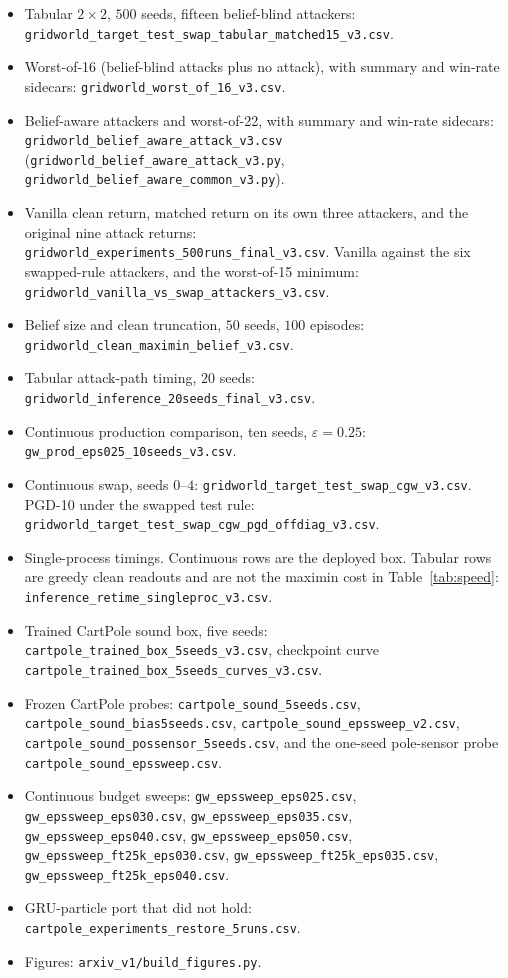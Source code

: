 \documentclass[10pt,twocolumn]{article}
\begin{document}
{\raggedright\footnotesize
\begin{itemize}[leftmargin=1.1em]
\item Tabular $2{\times}2$, $500$ seeds, fifteen belief-blind attackers:
\texttt{gridworld\_target\_test\_swap\_tabular\_matched15\_v3.csv}.
\item Worst-of-16 (belief-blind attacks plus no attack), with summary and win-rate sidecars:
\texttt{gridworld\_worst\_of\_16\_v3.csv}.
\item Belief-aware attackers and worst-of-22, with summary and win-rate sidecars:
\texttt{gridworld\_belief\_aware\_attack\_v3.csv}
(\texttt{gridworld\_belief\_aware\_attack\_v3.py},
\texttt{gridworld\_belief\_aware\_common\_v3.py}).
\item Vanilla clean return, matched return on its own three attackers, and the original nine attack returns:
\texttt{gridworld\_experiments\_500runs\_final\_v3.csv}.
Vanilla against the six swapped-rule attackers, and the worst-of-15 minimum:
\texttt{gridworld\_vanilla\_vs\_swap\_attackers\_v3.csv}.
\item Belief size and clean truncation, $50$ seeds, $100$ episodes:
\texttt{gridworld\_clean\_maximin\_belief\_v3.csv}.
\item Tabular attack-path timing, $20$ seeds:
\texttt{gridworld\_inference\_20seeds\_final\_v3.csv}.
\item Continuous production comparison, ten seeds, $\varepsilon{=}0.25$:
\texttt{gw\_prod\_eps025\_10seeds\_v3.csv}.
\item Continuous swap, seeds $0$--$4$:
\texttt{gridworld\_target\_test\_swap\_cgw\_v3.csv}.
PGD-10 under the swapped test rule:
\texttt{gridworld\_target\_test\_swap\_cgw\_pgd\_offdiag\_v3.csv}.
\item Single-process timings.
Continuous rows are the deployed box.
Tabular rows are greedy clean readouts and are not the maximin cost in Table~\ref{tab:speed}:
\texttt{inference\_retime\_singleproc\_v3.csv}.
\item Trained CartPole sound box, five seeds:
\texttt{cartpole\_trained\_box\_5seeds\_v3.csv},
checkpoint curve \texttt{cartpole\_trained\_box\_5seeds\_curves\_v3.csv}.
\item Frozen CartPole probes:
\texttt{cartpole\_sound\_5seeds.csv},
\texttt{cartpole\_sound\_bias5seeds.csv},
\texttt{cartpole\_sound\_epssweep\_v2.csv},
\texttt{cartpole\_sound\_possensor\_5seeds.csv},
and the one-seed pole-sensor probe \texttt{cartpole\_sound\_epssweep.csv}.
\item Continuous budget sweeps:
\texttt{gw\_epssweep\_eps025.csv},
\texttt{gw\_epssweep\_eps030.csv},
\texttt{gw\_epssweep\_eps035.csv},
\texttt{gw\_epssweep\_eps040.csv},
\texttt{gw\_epssweep\_eps050.csv},
\texttt{gw\_epssweep\_ft25k\_eps030.csv},
\texttt{gw\_epssweep\_ft25k\_eps035.csv},
\texttt{gw\_epssweep\_ft25k\_eps040.csv}.
\item GRU-particle port that did not hold: \texttt{cartpole\_experiments\_restore\_5runs.csv}.
\item Figures: \texttt{arxiv\_v1/build\_figures.py}.
\end{itemize}}
\end{document}
